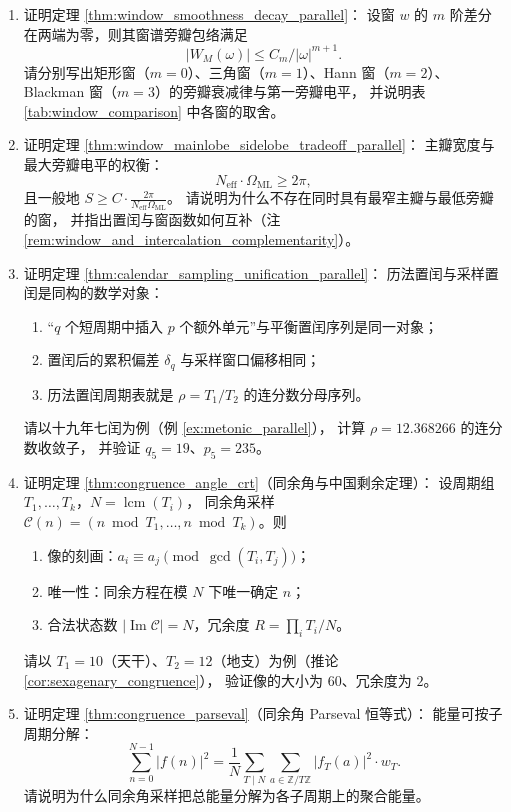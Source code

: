\begin{enumerate}[leftmargin=3em, label=\textbf{题 \arabic*}]
    \item 证明定理 \ref{thm:window_smoothness_decay_parallel}：
    设窗 $w$ 的 $m$ 阶差分在两端为零，则其窗谱旁瓣包络满足
    \[
    |W_M(\omega)|\le C_m/|\omega|^{m+1}.
    \]
    请分别写出矩形窗（$m=0$）、三角窗（$m=1$）、Hann 窗（$m=2$）、
    Blackman 窗（$m=3$）的旁瓣衰减律与第一旁瓣电平，
    并说明表 \ref{tab:window_comparison} 中各窗的取舍。

    \item 证明定理 \ref{thm:window_mainlobe_sidelobe_tradeoff_parallel}：
    主瓣宽度与最大旁瓣电平的权衡：
    \[
    N_{\mathrm{eff}}\cdot\Omega_{\mathrm{ML}}\ge2\pi,
    \]
    且一般地 $S\ge C\cdot\frac{2\pi}{N_{\mathrm{eff}}\Omega_{\mathrm{ML}}}$。
    请说明为什么不存在同时具有最窄主瓣与最低旁瓣的窗，
    并指出置闰与窗函数如何互补（注 \ref{rem:window_and_intercalation_complementarity}）。

    \item 证明定理 \ref{thm:calendar_sampling_unification_parallel}：
    历法置闰与采样置闰是同构的数学对象：
    \begin{enumerate}[label=(\roman*)]
        \item “$q$ 个短周期中插入 $p$ 个额外单元”与平衡置闰序列是同一对象；
        \item 置闰后的累积偏差 $\delta_q$ 与采样窗口偏移相同；
        \item 历法置闰周期表就是 $\rho=T_1/T_2$ 的连分数分母序列。
    \end{enumerate}
    请以十九年七闰为例（例 \ref{ex:metonic_parallel}），
    计算 $\rho=12.368266$ 的连分数收敛子，
    并验证 $q_5=19$、$p_5=235$。

    \item 证明定理 \ref{thm:congruence_angle_crt}（同余角与中国剩余定理）：
    设周期组 $T_1,\dots,T_k$，$N=\operatorname{lcm}(T_i)$，
    同余角采样 $\mathcal{C}(n)=(n\bmod T_1,\dots,n\bmod T_k)$。则
    \begin{enumerate}[label=(\roman*)]
        \item 像的刻画：$a_i\equiv a_j\pmod{\gcd(T_i,T_j)}$；
        \item 唯一性：同余方程在模 $N$ 下唯一确定 $n$；
        \item 合法状态数 $|\operatorname{Im}\mathcal{C}|=N$，冗余度
              $R=\prod_iT_i/N$。
    \end{enumerate}
    请以 $T_1=10$（天干）、$T_2=12$（地支）为例（推论 \ref{cor:sexagenary_congruence}），
    验证像的大小为 $60$、冗余度为 $2$。

    \item 证明定理 \ref{thm:congruence_parseval}（同余角 Parseval 恒等式）：
    能量可按子周期分解：
    \[
    \sum_{n=0}^{N-1}|f(n)|^2
    =\frac{1}{N}\sum_{T\mid N}\sum_{a\in\mathbb{Z}/T\mathbb{Z}}
    |f_T(a)|^2\cdot w_T.
    \]
    请说明为什么同余角采样把总能量分解为各子周期上的聚合能量。


\end{enumerate}
